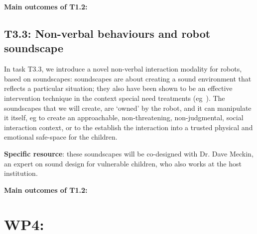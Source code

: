 \documentclass[11pt,a4paper]{report}
\begin{document}
\begin{framed}
    {\bf Main outcomes of T1.2:}
\end{framed}


\subsection{T3.3: Non-verbal behaviours and robot soundscape}



In task T3.3, we
introduce a novel non-verbal interaction modality for robots, based on
soundscapes: soundscapes are about creating a sound environment that reflects a
particular situation; they also have been shown to be an effective intervention
technique in the context special need treatments
(eg~\cite{greher2010soundscape}). The soundscapes that we will create, are
`owned' by the robot, and it can manipulate it itself, eg to create an
approachable, non-threatening, non-judgmental, social interaction context, or to
the establish the interaction into a trusted physical and emotional safe-space
for the children.

\textbf{Specific resource}: these soundscapes will be co-designed with Dr.
Dave Meckin, an expert on sound design for vulnerable children, who also works
at the host institution.


\begin{framed}
    {\bf Main outcomes of T1.2:}
\end{framed}



\section{WP4: \textbf{\wpFour}}
\end{document}

